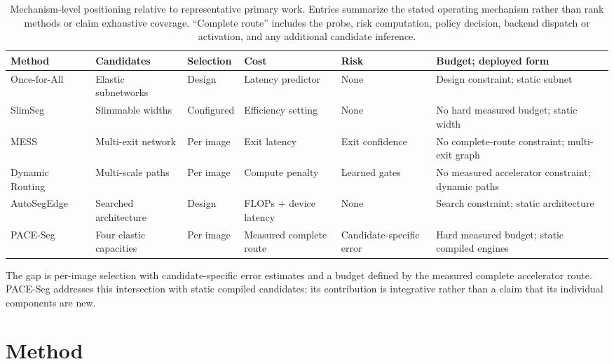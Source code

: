 \documentclass[a4paper,review,12pt]{elsarticle}
\newcommand{\method}{PACE-Seg}
\begin{document}
\begin{table}[H]
\centering
\caption{Mechanism-level positioning relative to representative primary work. Entries summarize the stated operating mechanism rather than rank methods or claim exhaustive coverage. ``Complete route'' includes the probe, risk computation, policy decision, backend dispatch or activation, and any additional candidate inference.}
\label{tab:related-positioning}
\scriptsize
\setlength{\tabcolsep}{2pt}
\renewcommand{\arraystretch}{1.08}
\begin{tabular}{@{}>{\raggedright\arraybackslash}p{2.3cm}>{\raggedright\arraybackslash}p{2.0cm}>{\raggedright\arraybackslash}p{1.45cm}>{\raggedright\arraybackslash}p{2.1cm}>{\raggedright\arraybackslash}p{2.0cm}>{\raggedright\arraybackslash}p{3.35cm}@{}}
\toprule
Method & Candidates & Selection & Cost & Risk & Budget; deployed form \\
\midrule
Once-for-All~\cite{cai2020ofa} & Elastic subnetworks & Design & Latency predictor & None & Design constraint; static subnet \\
SlimSeg~\cite{xue2022slimseg} & Slimmable widths & Configured & Efficiency setting & None & No hard measured budget; static width \\
MESS~\cite{kouris2022mess} & Multi-exit network & Per image & Exit latency & Exit confidence & No complete-route constraint; multi-exit graph \\
Dynamic Routing~\cite{li2020dynamic} & Multi-scale paths & Per image & Compute penalty & Learned gates & No measured accelerator constraint; dynamic paths \\
AutoSegEdge~\cite{dou2023autosegedge} & Searched architecture & Design & FLOPs + device latency & None & Search constraint; static architecture \\
\method{} & Four elastic capacities & Per image & Measured complete route & Candidate-specific error & Hard measured budget; static compiled engines \\
\bottomrule
\end{tabular}
\end{table}

The gap is per-image selection with candidate-specific error estimates and a budget defined by the measured complete accelerator route. \method{} addresses this intersection with static compiled candidates; its contribution is integrative rather than a claim that its individual components are new.

\section{Method}
\label{sec:method}
\end{document}
